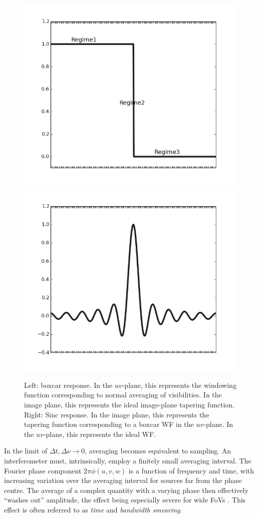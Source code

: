 \documentclass[useAMS,usenatbib]{mn2e}
\begin{document}
\begin{figure}
\includegraphics[width=.5\textwidth]{./Figures/idealIPRgrey.png}%
\includegraphics[width=.5\textwidth]{./Figures/idealsincgrey.png}\\
\caption{Left: boxcar response. In the $uv$-plane, this represents the windowing function corresponding to normal
averaging of visibilities. In the image plane, this represents the ideal image-plane tapering function. Right: 
Sinc response. In the image plane, this represents the tapering function corresponding to a boxcar WF in 
the $uv$-plane. In the $uv$-plane, this represents the ideal WF.}
\label{fig:idealWF}
\end{figure}

In the limit of $\Delta t,\Delta \nu \rightarrow 0$, averaging becomes equivalent to sampling. 
An interferometer must, intrinsically, employ a finitely small averaging interval. The Fourier phase 
component $2\pi\phi(u,v,w)$ is a function of frequency and time, with increasing variation over the averaging interval 
for sources far from the phase centre. The average of a complex quantity with a varying phase then effectively ``washes out'' 
amplitude, the effect being especially severe for wide FoVs \citep[for an extensive discussion, see][]{bregman2012system}. This
effect is often referred to as \emph{time} and \emph{bandwidth smearing}.
\end{document}
